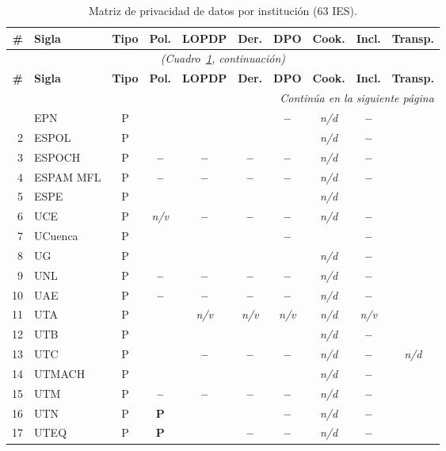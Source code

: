\documentclass[11pt,a4paper]{article}
\newcommand{\si}{\ding{51}}                 %
\newcommand{\no}{\textcolor{gris}{\textbf{--}}} %
\newcommand{\pc}{\textbf{P}}                 %
\newcommand{\nv}{\textsl{\footnotesize n/v}}%
\newcommand{\nd}{\textsl{\footnotesize n/d}}%
\begin{document}
\small
\begin{longtable}{@{}r l c c c c c c c c@{}}
	\caption{Matriz de privacidad de datos por instituci\'on (63 IES).}\label{tab:matriz}\\
	\toprule
	\textbf{\#} & \textbf{Sigla} & \textbf{Tipo} & \textbf{Pol.} & \textbf{LOPDP} & \textbf{Der.} & \textbf{DPO} & \textbf{Cook.} & \textbf{Incl.} & \textbf{Transp.} \\
	\midrule
	\endfirsthead
	\multicolumn{10}{c}{\textit{(Cuadro~\ref{tab:matriz}, continuaci\'on)}}\\
	\toprule
	\textbf{\#} & \textbf{Sigla} & \textbf{Tipo} & \textbf{Pol.} & \textbf{LOPDP} & \textbf{Der.} & \textbf{DPO} & \textbf{Cook.} & \textbf{Incl.} & \textbf{Transp.} \\
	\midrule
	\endhead
	\midrule
	\multicolumn{10}{r}{\textit{Contin\'ua en la siguiente p\'agina}}\\
	\endfoot
	\bottomrule
	\endlastfoot
	1 & EPN & P & \si & \si & \si & \no & \nd & \no & \si \\
	2 & ESPOL & P & \si & \si & \si & \si & \nd & \no & \si \\
	3 & ESPOCH & P & \no & \no & \no & \no & \nd & \no & \si \\
	4 & ESPAM MFL & P & \no & \no & \no & \no & \nd & \no & \si \\
	5 & ESPE & P & \si & \si & \si & \si & \nd & \si & \si \\
	6 & UCE & P & \nv & \no & \no & \no & \nd & \no & \si \\
	7 & UCuenca & P & \si & \si & \si & \no & \si & \no & \si \\
	8 & UG & P & \si & \si & \si & \si & \nd & \no & \si \\
	9 & UNL & P & \no & \no & \no & \no & \nd & \no & \si \\
	10 & UAE & P & \no & \no & \no & \no & \nd & \no & \si \\
	11 & UTA & P & \si & \nv & \nv & \nv & \nd & \nv & \si \\
	12 & UTB & P & \si & \si & \si & \si & \nd & \no & \si \\
	13 & UTC & P & \si & \no & \no & \no & \nd & \no & \nd \\
	14 & UTMACH & P & \si & \si & \si & \si & \nd & \no & \si \\
	15 & UTM & P & \no & \no & \no & \no & \nd & \no & \si \\
	16 & UTN & P & \pc & \si & \si & \no & \nd & \no & \si \\
	17 & UTEQ & P & \pc & \si & \no & \no & \nd & \no & \si \\

\end{longtable}
\end{document}
